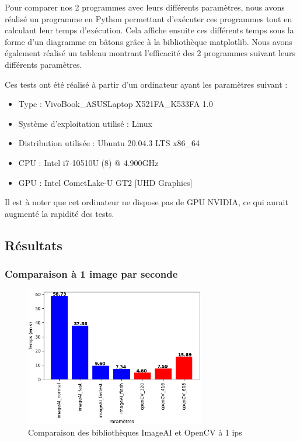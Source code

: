 Pour comparer nos 2 programmes avec leurs différents paramètres, nous avons réalisé un programme en Python permettant
d'exécuter ces programmes tout en calculant leur temps d'exécution.
Cela affiche ensuite ces différents temps sous la forme d'un diagramme en bâtons grâce à la bibliothèque matplotlib.
Nous avons également réalisé un tableau montrant l'efficacité des 2 programmes suivant leurs différents paramètres.

Ces tests ont été réalisé à partir d'un ordinateur ayant les paramètres suivant :
\begin{itemize}
    \item Type : VivoBook\_ASUSLaptop X521FA\_K533FA 1.0
    \item Système d'exploitation utilisé : Linux
    \item Distribution utilisée : Ubuntu 20.04.3 LTS x86\_64
    \item \gls{CPU} : Intel i7-10510U (8) @ 4.900GHz
    \item \gls{GPU} : Intel CometLake-U GT2 [UHD Graphics]
\end{itemize}
Il est à noter que cet ordinateur ne dispose pas de GPU NVIDIA, ce qui aurait augmenté la rapidité des tests.

\subsection{Résultats}
\label{sec:comparaisonIA:resultats}

\subsubsection{Comparaison à 1 image par seconde}
\label{sec:comparaisonIA:resultats:1fps}

\begin{figure}[H]
    \centering
    \includegraphics[width=0.7\textwidth]{img/result_1fps.png}
    \caption{Comparaison des bibliothèques ImageAI et OpenCV à 1 ips}
\end{figure}

